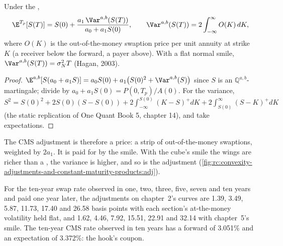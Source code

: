 \begin{proposition}\label{prop:rc:convexity-adjustments-and-constant-maturity-products:cms}
Under the ,
\[
\E^{T_p}[S(T)] = S(0) + \frac{a_1\,\Var^{a,b}(S(T))}{a_0+a_1S(0)},\qquad
\Var^{a,b}(S(T)) = 2\int_{-\infty}^{\infty} O(K)\,dK,
\]
where $O(K)$ is the out-of-the-money swaption price per unit annuity at strike
$K$ (a receiver below the forward, a payer above). With a flat normal smile,
$\Var^{a,b}(S(T)) = \sigma_N^2T$ (Hagan, 2003).
\end{proposition}
\begin{proof}
$\E^{a,b}[S(a_0+a_1S)] = a_0S(0) + a_1\bigl(S(0)^2+\Var^{a,b}(S)\bigr)$ since $S$ is
an $\mathbb Q^{a,b}$-martingale; divide by $a_0+a_1S(0) = P(0,T_p)/A(0)$. For the
variance, $S^2 = S(0)^2 + 2S(0)(S-S(0)) + 2\int_{-\infty}^{S(0)}(K-S)^+dK +
2\int_{S(0)}^{\infty}(S-K)^+dK$ (the static replication of One Quant Book 5,
chapter 14), and take expectations.
\end{proof}

\label{lst:rc:convexity-adjustments-and-constant-maturity-products:cms}

The CMS adjustment is therefore a price: a strip of out-of-the-money swaptions,
weighted by $2a_1$. It is paid for by the smile. With the cube's smile the
wings are richer than a , the variance is higher, and so is the
adjustment (\cref{fig:rc:convexity-adjustments-and-constant-maturity-products:adj}).

\begin{example}\label{ex:rc:convexity-adjustments-and-constant-maturity-products:cmsadj}
For the ten-year swap rate observed in one, two, three, five, seven and ten
years and paid one year later, the adjustments on chapter~2's curves are
1.39, 3.49, 5.87, 11.73, 17.40 and 26.58 basis points with each section's
at-the-money volatility held flat, and 1.62, 4.46, 7.92, 15.51, 22.91 and 32.14
with chapter~5's smile. The ten-year CMS rate observed in ten years has a
forward of 3.051\% and an expectation of 3.372\%: the hook's coupon.
\end{example}

